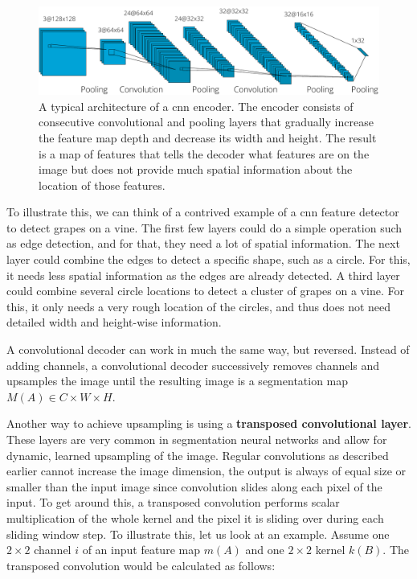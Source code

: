 \begin{figure}[h]
 \centering
 \includegraphics[width=\linewidth]{images/cnn_encoder_example.pdf}
 \caption{A typical architecture of a \ac{cnn} encoder. The encoder consists of consecutive convolutional and pooling layers that gradually increase the feature map depth and decrease its width and height. The result is a map of features that tells the decoder what features are on the image but does not provide much spatial information about the location of those features. \cite{lecunGradientbasedLearningApplied1998}}
 \label{fig:cnn-encoder-achitecture}
 \end{figure}

To illustrate this, we can think of a contrived example of a \ac{cnn} feature detector to detect grapes on a vine. The first few layers could do a simple operation such as edge detection, and for that, they need a lot of spatial information. The next layer could combine the edges to detect a specific shape, such as a circle. For this, it needs less spatial information as the edges are already detected. A third layer could combine several circle locations to detect a cluster of grapes on a vine. For this, it only needs a very rough location of the circles, and thus does not need detailed width and height-wise information.

A convolutional decoder can work in much the same way, but reversed. Instead of adding channels, a convolutional decoder successively removes channels and upsamples the image until the resulting image is a segmentation map $M(A) \in C \times W \times H$. 

Another way to achieve upsampling is using a \textbf{transposed convolutional layer}. These layers are very common in segmentation neural networks and allow for dynamic, learned upsampling of the image. Regular convolutions as described earlier cannot increase the image dimension, the output is always of equal size or smaller than the input image since convolution slides along each pixel of the input. To get around this, a transposed convolution performs scalar multiplication of the whole kernel and the pixel it is sliding over during each sliding window step. To illustrate this, let us look at an example. Assume one $2 \times 2$ channel $i$ of an input feature map $m(A)$ and one $2 \times 2$ kernel $k(B)$. The transposed convolution would be calculated as follows:

